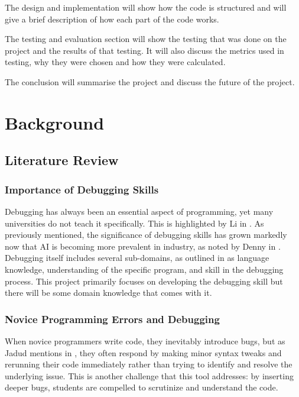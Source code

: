 \documentclass[12pt]{extarticle}
\begin{document}
The design and implementation will show how the code is structured and will give a brief description of how each part of the code works.

The testing and evaluation section will show the testing that was done on the project and the results of that testing. It will also discuss the metrics used in testing, why they were chosen and how they were calculated.

The conclusion will summarise the project and discuss the future of the project.
\newpage
\section{Background}

\subsection{Literature Review}

\subsubsection{Importance of Debugging Skills}

Debugging has always been an essential aspect of programming, yet many universities do not teach it specifically. This is highlighted by Li in \cite{li2019}. As previously mentioned, the significance of debugging skills has grown markedly now that AI is becoming more prevalent in industry, as noted by Denny in \cite{denny2024}. Debugging itself includes several sub-domains, as outlined in \cite{li2019} as language knowledge, understanding of the specific program, and skill in the debugging process. This project primarily focuses on developing the debugging skill but there will be some domain knowledge that comes with it.

\subsubsection{Novice Programming Errors and Debugging}

When novice programmers write code, they inevitably introduce bugs, but as Jadud mentions in \cite{jadud2006}, they often respond by making minor syntax tweaks and rerunning their code immediately rather than trying to identify and resolve the underlying issue. This is another challenge that this tool addresses: by inserting deeper bugs, students are compelled to scrutinize and understand the code.
\end{document}
